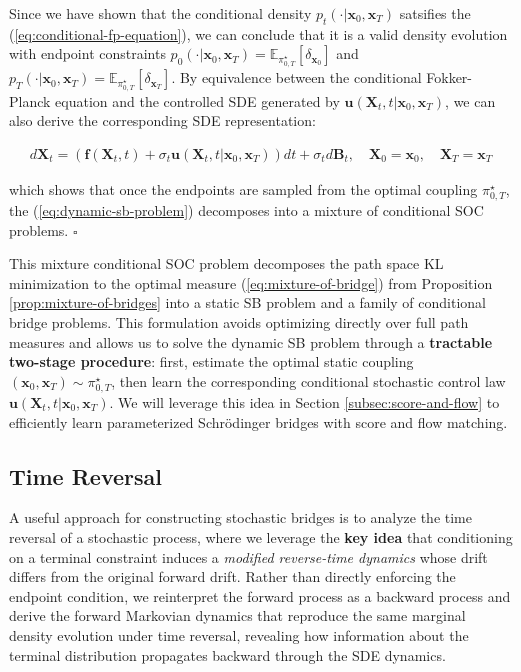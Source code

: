\documentclass{article}
\begin{document}
Since we have shown that the conditional density $p_t(\cdot|\boldsymbol{x}_0, \boldsymbol{x}_T)$ satsifies the (\ref{eq:conditional-fp-equation}), we can conclude that it is a valid density evolution with endpoint constraints $p_0(\cdot|\boldsymbol{x}_0, \boldsymbol{x}_T)=\mathbb{E}_{\pi^\star_{0,T}}[\delta_{\boldsymbol{x}_0}]$ and $p_T(\cdot|\boldsymbol{x}_0, \boldsymbol{x}_T)=\mathbb{E}_{\pi^\star_{0,T}}[\delta_{\boldsymbol{x}_T}]$. By equivalence between the conditional Fokker-Planck equation and the controlled SDE generated by $\boldsymbol{u}(\boldsymbol{X}_t,t|\boldsymbol{x}_0, \boldsymbol{x}_T)$, we can also derive the corresponding SDE representation:
\begin{small}
\begin{align}
    \boxed{d\boldsymbol{X}_t =(\boldsymbol{f}(\boldsymbol{X}_t,t)+\sigma_t\boldsymbol{u}(\boldsymbol{X}_t,t|\boldsymbol{x}_0, \boldsymbol{x}_T))dt+\sigma_td\boldsymbol{B}_t,  \quad \boldsymbol{X}_0=\boldsymbol{x}_0, \quad\boldsymbol{X}_T=\boldsymbol{x}_T}  
\end{align}
\end{small}
which shows that once the endpoints are sampled from the optimal coupling $\pi_{0,T}^\star$, the (\ref{eq:dynamic-sb-problem}) decomposes into a mixture of conditional SOC problems. \hfill $\square$

This mixture conditional SOC problem decomposes the path space KL minimization to the optimal measure (\ref{eq:mixture-of-bridge}) from Proposition \ref{prop:mixture-of-bridges} into a static SB problem and a family of conditional bridge problems. This formulation avoids optimizing directly over full path measures and allows us to solve the dynamic SB problem through a \textbf{tractable two-stage procedure}: first, estimate the optimal static coupling $(\boldsymbol{x}_0, \boldsymbol{x}_T) \sim \pi_{0,T}^\star$, then learn the corresponding conditional stochastic control law $\boldsymbol{u}(\boldsymbol{X}_t,t|\boldsymbol{x}_0, \boldsymbol{x}_T)$. We will leverage this idea in Section \ref{subsec:score-and-flow} to efficiently learn parameterized Schrödinger bridges with score and flow matching. 

\subsection{Time Reversal}
\label{subsec:time-reversal}
A useful approach for constructing stochastic bridges is to analyze the time reversal of a stochastic process, where we leverage the \textbf{key idea} that conditioning on a terminal constraint induces a \textit{modified reverse-time dynamics} whose drift differs from the original forward drift. Rather than directly enforcing the endpoint condition, we reinterpret the forward process as a backward process and derive the forward Markovian dynamics that reproduce the same marginal density evolution under time reversal, revealing how information about the terminal distribution propagates backward through the SDE dynamics.
\end{document}
